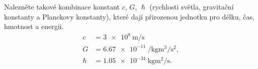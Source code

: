 \begin{mdframed}[style=mdexam]
  \begin{example}\label{fyz:exam025}
    Nalezněte takové kombinace konstant \(c\), \(G\), \(\hslash\) (rychlosti světla, gravitační
    konstanty a Planckovy konstanty), které dají přirozenou jednotku pro délku, čas, hmotnost a
    energii.
    \begin{subequations}\label{fyz:eq750} 
      \begin{align}
        c       &= \SI{3e8}{\m\per\s}                              \label{fyz:eq750a}  \\
        G       &= \SI{6,67e-11}{\per\kg\cubic\m\per\square\s},    \label{fyz:eq750b}  \\
        \hslash &= \SI{1,05e-34}{\kg\square\m\per\s} .             \label{fyz:eq750c}
      \end{align}
    \end{subequations}


\end{example}
\end{mdframed}
